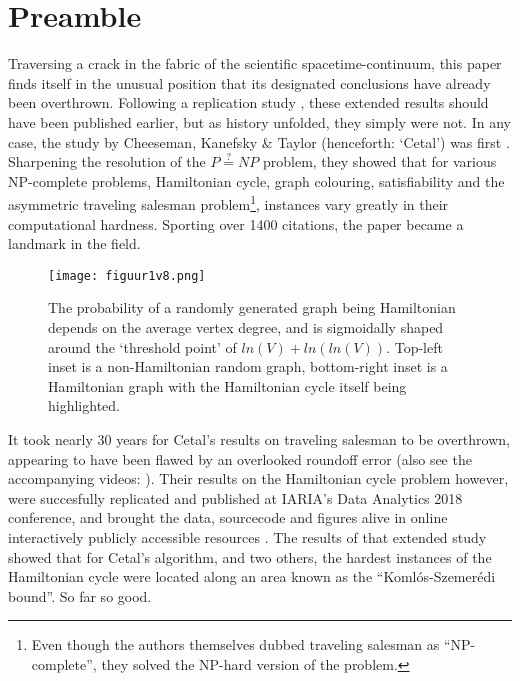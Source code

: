 \documentclass[10pt,conference,compsocconf]{IEEEtran}
\begin{document}
%
\IEEEpeerreviewmaketitle



\section{Preamble}
\noindent Traversing a crack in the fabric of the scientific spacetime-continuum, this paper finds itself in the unusual position that its designated  conclusions have already been overthrown. Following a replication study \cite{van2018predictive}, these extended results should  have been published earlier, but as history unfolded, they simply were not. In any case, the study by Cheeseman, Kanefsky \& Taylor (henceforth: `Cetal') was first \cite{cheeseman1991really}. Sharpening the resolution of the $P\stackrel{?}{=}NP$ problem, they showed that for various NP-complete problems, Hamiltonian cycle, graph colouring, satisfiability and the asymmetric traveling salesman problem\footnote{Even though the authors themselves dubbed traveling salesman as ``NP-complete'', they solved the NP-hard version of the problem.}, instances vary greatly in their computational hardness. Sporting over 1400 citations, the paper became a landmark in the field.

\begin{figure*}[ht]
\centering%
\texttt{[image: figuur1v8.png]}
\caption{The probability of a randomly generated graph being Hamiltonian depends on the average vertex degree, and is  sigmoidally shaped around the ‘threshold point’ of $ln(V) + ln(ln(V))$. Top-left inset is a non-Hamiltonian random graph, bottom-right inset is a Hamiltonian graph with the Hamiltonian cycle itself being highlighted.}
\label{fig:hamiltonianphasetransition}
\end{figure*}

It took nearly 30 years for Cetal's results on traveling salesman to be overthrown, appearing to have been flawed by an overlooked roundoff error\cite{sleegers2020really} (also see the accompanying videos: \cite{videoATSP1}\cite{videoATSP2}). Their results on the Hamiltonian cycle problem however, were succesfully replicated and published at IARIA's Data Analytics 2018 conference, and brought the data, sourcecode and figures alive in online interactively publicly accessible resources \cite{van2018predictive}\cite{Gijsinteractivesite}. The results of that extended study showed that for Cetal's algorithm, and two others, the hardest instances of the Hamiltonian cycle were located along an area known as the  ``Koml\'os-Szemer\'edi bound''. So far so good.
\end{document}
